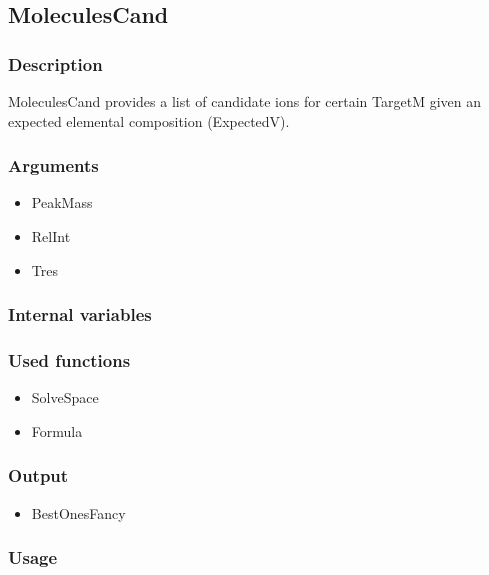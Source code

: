 \subsection{MoleculesCand}
\subsubsection{Description}
MoleculesCand provides a list of candidate ions for certain TargetM given an expected elemental composition (ExpectedV).
\subsubsection{Arguments}
\begin{itemize}
\item PeakMass
\item RelInt
\item Tres
\end{itemize}
\subsubsection{Internal variables}
\subsubsection{Used functions}
\begin{itemize}
\item SolveSpace
\item Formula
\end{itemize}
\subsubsection{Output}
\begin{itemize}
\item BestOnesFancy %
\end{itemize}
\subsubsection{Usage}

